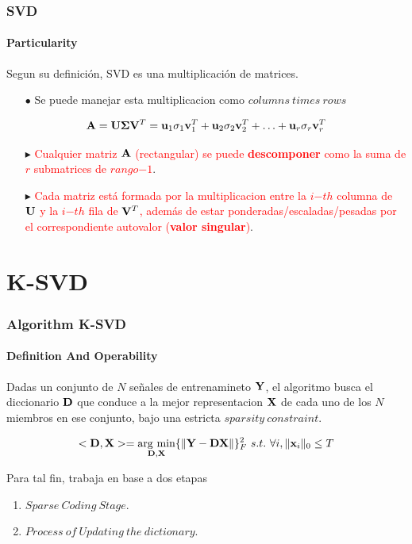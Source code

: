 \documentclass[spanish,xcolor=dvipsnames]{beamer}
\DeclareMathOperator*{\argmin}{arg\ min}
\begin{document}
\begin{frame}
	\frametitle{SVD}
	\framesubtitle{Particularity}
	
Segun su definición, SVD es una multiplicación de matrices.

	\begin{itemize}
		\item [\color {black} \bf $\bullet$] Se puede manejar esta multiplicacion como $columns \ times \ rows$
	\end{itemize}

	\begin{equation}
		\nonumber {\bf A}={\bf U} {\bf \Sigma} {\bf V}^T={\bf u}_1{\bf \sigma}_1{\bf v}_1^T+{\bf u}_2{\bf \sigma}_2{\bf v}_2^T+ \ldots + {\bf u}_r{\bf \sigma}_r{\bf v}_r^T
	\end{equation}

	\begin{itemize}
		\item [\color{red} \bf $\blacktriangleright$] \textcolor{red} {Cualquier matriz ${\bf A}$ (rectangular) se puede \textbf{descomponer} como la suma de $r$ submatrices de $rango$$-$$1$}.
		\item [\color{red} \bf $\blacktriangleright$] \textcolor{red} {Cada matriz está formada por la multiplicacion entre la $i$$-$$th$ columna de ${\bf U}$ y la $i$$-$$th$ fila de ${\bf V}^T$, además de estar ponderadas/escaladas/pesadas por el correspondiente autovalor (\textbf{valor singular})}.
	\end{itemize}

\end{frame}
 
\section{K-SVD}
\begin{frame}
	\frametitle{Algorithm K-SVD}
	\framesubtitle{Definition And Operability}
Dadas un conjunto de $N$ señales de entrenamineto ${\bf Y}$, el algoritmo busca el diccionario ${\bf D}$ que conduce a la mejor representacion ${\bf X}$ de cada uno de los $N$ miembros en ese conjunto, bajo una estricta $sparsity \ constraint$.

	\begin{equation} \label{eq:main problem}
		<{\bf D},{\bf X}>=\argmin_{\bf D,\bf X}\{\|{\bf Y}-{\bf DX}\|\}_F^2\  s.t.\ \forall i, \|{\bf x}_i\|_0\leq T    	\end{equation}

Para tal fin, trabaja en base a dos etapas

	\begin{enumerate}
		\item $Sparse \ Coding \ Stage$.
		\item $Process \ of \ Updating \ the \ dictionary$.
	\end{enumerate}

\end{frame}
\end{document}
